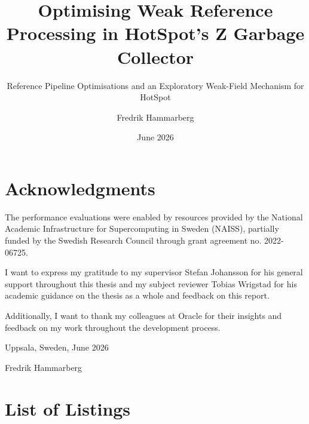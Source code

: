 \documentclass[a4paper]{UUThesisTemplate}
\title{Optimising Weak Reference Processing in HotSpot's Z Garbage Collector}
\subtitle{Reference Pipeline Optimisations and an Exploratory Weak-Field Mechanism for HotSpot}
\author{Fredrik Hammarberg}
\date{June 2026}
\makeatletter
\newcommand{\listoflistings}{\listof{listing}{List of Listings}}
\newcommand*\listingnumberline[1]{\hb@xt@ \@tempdima {Listing~#1:\hfil}}
\renewcommand{\listoflistings}{%
	\chapter*{List of Listings}%
	\def\l@listing##1##2{%
		\let\numberline\listingnumberline%
		\customtocline{##1}{##2}{\z@}{6.5em}{0}%
		\renewcommand{\numberline}{\stdnumberline}%
	}%
	\begingroup\setlength{\parskip}{\z@}%
		\@starttoc{lol}%
	\endgroup%
}
\makeatother
\begin{document}
\frontmatter
	
	\setcounter{page}{6}
    \pagestyle{plain}     %
    
    
    \chapter*{Acknowledgments}

	The performance evaluations were enabled by resources provided by the National Academic Infrastructure for Supercomputing in Sweden (NAISS), partially funded by the Swedish Research Council through grant agreement no. 2022-06725.
    
    I want to express my gratitude to my supervisor Stefan Johansson for his general support throughout this thesis and my subject reviewer Tobias Wrigstad for his academic guidance on the thesis as a whole and feedback on this report.
    
	Additionally, I want to thank my colleagues at Oracle for their insights and feedback on my work throughout the development process.
    
    \vspace{1cm}
    
    Uppsala, Sweden, June 2026
    
    \vspace{0.5cm}
    
    Fredrik Hammarberg
    
    \begingroup
        \tableofcontents
    \endgroup
    
    \listoftables
    \listoffigures
	\listoflistings

\end{document}
